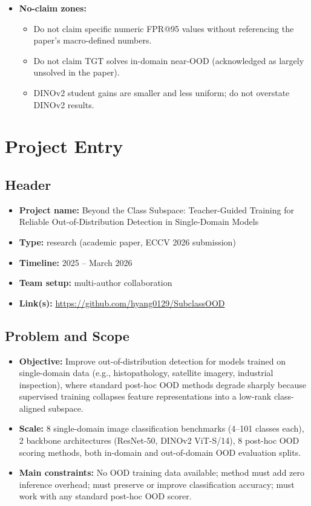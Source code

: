 \documentclass{article}
\begin{document}
\begin{itemize}
\begin{itemize}
    \end{itemize}
    \item \textbf{No-claim zones:}
    \begin{itemize}
        \item Do not claim specific numeric FPR@95 values without referencing the paper's macro-defined numbers.
        \item Do not claim TGT solves in-domain near-OOD (acknowledged as largely unsolved in the paper).
        \item DINOv2 student gains are smaller and less uniform; do not overstate DINOv2 results.
    \end{itemize}
\end{itemize}

\section{Project Entry}

\subsection{Header}
\begin{itemize}
    \item \textbf{Project name:} Beyond the Class Subspace: Teacher-Guided Training for Reliable Out-of-Distribution Detection in Single-Domain Models
    \item \textbf{Type:} research (academic paper, ECCV 2026 submission)
    \item \textbf{Timeline:} 2025 -- March 2026
    \item \textbf{Team setup:} multi-author collaboration
    \item \textbf{Link(s):} \url{https://github.com/hyang0129/SubclassOOD}
\end{itemize}

\subsection{Problem and Scope}
\begin{itemize}
    \item \textbf{Objective:} Improve out-of-distribution detection for models trained on single-domain data (e.g., histopathology, satellite imagery, industrial inspection), where standard post-hoc OOD methods degrade sharply because supervised training collapses feature representations into a low-rank class-aligned subspace.
    \item \textbf{Scale:} 8 single-domain image classification benchmarks (4--101 classes each), 2 backbone architectures (ResNet-50, DINOv2 ViT-S/14), 8 post-hoc OOD scoring methods, both in-domain and out-of-domain OOD evaluation splits.
    \item \textbf{Main constraints:} No OOD training data available; method must add zero inference overhead; must preserve or improve classification accuracy; must work with any standard post-hoc OOD scorer.
\end{itemize}
\end{document}
